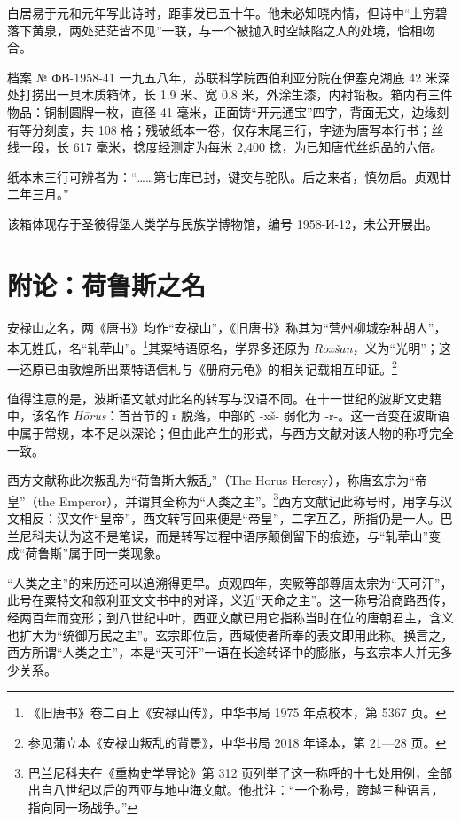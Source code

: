 白居易于元和元年写此诗时，距事发已五十年。他未必知晓内情，但诗中“上穷碧落下黄泉，两处茫茫皆不见”一联，与一个被抛入时空缺陷之人的处境，恰相吻合。

\begin{archive}{档案 № ФВ-1958-41}
一九五八年，苏联科学院西伯利亚分院在伊塞克湖底 42 米深处打捞出一具木质箱体，长 1.9 米、宽 0.8 米，外涂生漆，内衬铅板。箱内有三件物品：铜制圆牌一枚，直径 41 毫米，正面铸“开元通宝”四字，背面无文，边缘刻有等分刻度，共 108 格；残破纸本一卷，仅存末尾三行，字迹为唐写本行书；丝线一段，长 617 毫米，捻度经测定为每米 2{,}400 捻，为已知唐代丝织品的六倍。

纸本末三行可辨者为：“……第七库已封，键交与驼队。后之来者，慎勿启。贞观廿二年三月。”

该箱体现存于圣彼得堡人类学与民族学博物馆，编号 1958-И-12，未公开展出。
\end{archive}

\section{附论：荷鲁斯之名}

安禄山之名，两《唐书》均作“安禄山”，《旧唐书》称其为“营州柳城杂种胡人”，本无姓氏，名“轧荦山”。\footnote{《旧唐书》卷二百上《安禄山传》，中华书局 1975 年点校本，第 5367 页。}其粟特语原名，学界多还原为 \textit{Roxšan}，义为“光明”；这一还原已由敦煌所出粟特语信札与《册府元龟》的相关记载相互印证。\footnote{参见蒲立本《安禄山叛乱的背景》，中华书局 2018 年译本，第 21—28 页。}

值得注意的是，波斯语文献对此名的转写与汉语不同。在十一世纪的波斯文史籍中，该名作 \textit{Hōrus}：首音节的 r 脱落，中部的 -xš- 弱化为 -r-。这一音变在波斯语中属于常规，本不足以深论；但由此产生的形式，与西方文献对该人物的称呼完全一致。

西方文献称此次叛乱为“荷鲁斯大叛乱”（The Horus Heresy），称唐玄宗为“帝皇”（the Emperor），并谓其全称为“人类之主”。\footnote{巴兰尼科夫在《重构史学导论》第 312 页列举了这一称呼的十七处用例，全部出自八世纪以后的西亚与地中海文献。他批注：“一个称号，跨越三种语言，指向同一场战争。”}西方文献记此称号时，用字与汉文相反：汉文作“皇帝”，西文转写回来便是“帝皇”，二字互乙，所指仍是一人。巴兰尼科夫认为这不是笔误，而是转写过程中语序颠倒留下的痕迹，与“轧荦山”变成“荷鲁斯”属于同一类现象。

“人类之主”的来历还可以追溯得更早。贞观四年，突厥等部尊唐太宗为“天可汗”，此号在粟特文和叙利亚文文书中的对译，义近“天命之主”。这一称号沿商路西传，经两百年而变形；到八世纪中叶，西亚文献已用它指称当时在位的唐朝君主，含义也扩大为“统御万民之主”。玄宗即位后，西域使者所奉的表文即用此称。换言之，西方所谓“人类之主”，本是“天可汗”一语在长途转译中的膨胀，与玄宗本人并无多少关系。

